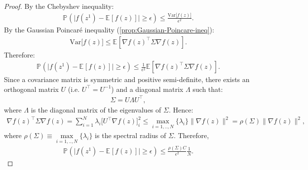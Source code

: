 \documentclass[12pt]{article}
\newcommand{\prob}[2][]{\ensuremath{\mathbb{P}_{#1}\left( {#2} \right)}}
\newcommand{\expec}[2][]{\ensuremath{\mathbb{E}_{{#1}}\left[ {#2} \right]}}
\begin{document}
\begin{proof}
By the Chebyshev inequality: 
\begin{align*}
\prob{\big|f(z^1)- \expec{f(z)}\big|\geq \epsilon} \leq \frac{\mathrm{Var}\big[f(z)\big]}{\epsilon^2}.
\end{align*}
By the Gaussian Poincar\'e inequality (\cref{prop:Gaussian-Poincare-ineq}):
\begin{align*}
\mathrm{Var}\big[f(z)\big] \leq \expec{\nabla f(z)^\top\Sigma \nabla f(z)}. 
\end{align*}
Therefore:
\begin{align*}
\prob{\big|f(z^1)- \expec{f(z)}\big|\geq \epsilon} \leq \frac{1}{\epsilon^2} \expec{\nabla f(z)^\top\Sigma \nabla f(z)}.
\end{align*}
Since a covariance matrix is symmetric and positive semi-definite, there exists an orthogonal matrix $U$ (i.e. $U^\top = U^{-1}$) and a diagonal matrix $\Lambda$ such that:
\begin{align*}
\Sigma = U\Lambda U^\top,
\end{align*}
where $\Lambda$ is the diagonal matrix of the eigenvalues of $\Sigma$. Hence:
\begin{align*}
\nabla f(z)^\top\Sigma \nabla f(z) = \sum_{i=1}^{N}\lambda_i \big[U^\top \nabla f(z)\big]_i^2\leq \max_{i=1,..,N} \{\lambda_i\} \|\nabla f(z)\|^2 = \rho(\Sigma) \|\nabla f(z)\|^2,
\end{align*}
where $\rho(\Sigma) \equiv \max\limits_{i=1,..,N} \{\lambda_i\}$ is the spectral radius of $\Sigma$. Therefore, 
\begin{align*}
\prob{\big|f(z^1)- \expec{f(z)}\big|\geq \epsilon} \leq \frac{\rho(\Sigma) C}{\epsilon^2}\frac{1}{N}.
\end{align*}
\end{proof}
\end{document}
